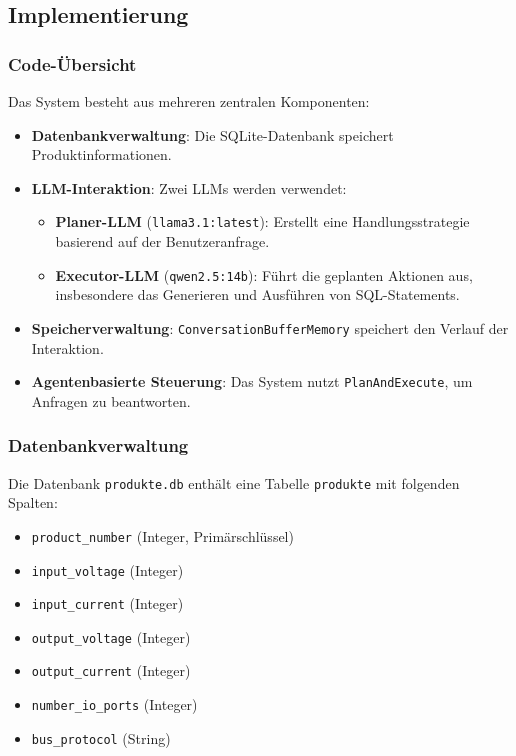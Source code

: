 
\subsection{Implementierung}


\subsubsection{Code-Übersicht}
Das System besteht aus mehreren zentralen Komponenten:
\begin{itemize}
    \item \textbf{Datenbankverwaltung}: Die SQLite-Datenbank speichert Produktinformationen.
    \item \textbf{LLM-Interaktion}: Zwei LLMs werden verwendet:
    \begin{itemize}
        \item \textbf{Planer-LLM} (\texttt{llama3.1:latest}): Erstellt eine Handlungsstrategie basierend auf der Benutzeranfrage.
        \item \textbf{Executor-LLM} (\texttt{qwen2.5:14b}): F\"uhrt die geplanten Aktionen aus, insbesondere das Generieren und Ausf\"uhren von SQL-Statements.
    \end{itemize}
    \item \textbf{Speicherverwaltung}: \texttt{ConversationBufferMemory} speichert den Verlauf der Interaktion.
    \item \textbf{Agentenbasierte Steuerung}: Das System nutzt \texttt{PlanAndExecute}, um Anfragen zu beantworten.
\end{itemize}

\subsubsection{Datenbankverwaltung}
Die Datenbank \texttt{produkte.db} enth\"alt eine Tabelle \texttt{produkte} mit folgenden Spalten:
\begin{itemize}
    \item \texttt{product\_number} (Integer, Prim\"arschl\"ussel)
    \item \texttt{input\_voltage} (Integer)
    \item \texttt{input\_current} (Integer)
    \item \texttt{output\_voltage} (Integer)
    \item \texttt{output\_current} (Integer)
    \item \texttt{number\_io\_ports} (Integer)
    \item \texttt{bus\_protocol} (String)
\end{itemize}

